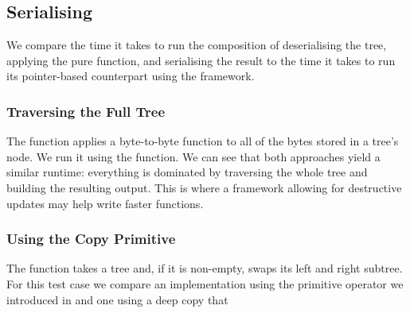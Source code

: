 

\subsection{Serialising}


We compare the time it takes to run the composition of deserialising
the tree, applying the pure function, and serialising the result
to the time it takes to run its pointer-based counterpart using the
 framework.

\subsubsection{Traversing the Full Tree}

The  function applies a byte-to-byte function
to all of the bytes stored in a tree's node.
%
We run it using the \IdrisKeyword{(}\IdrisFunction{+} \IdrisKeyword{)}
function.
%
We can see that both approaches yield a similar runtime: everything is
dominated by traversing the whole tree and building the resulting output.
%
This is where a framework allowing for destructive updates may help
write faster functions.

\noindent
\begin{minipage}{.5\textwidth}
\end{minipage}\hfill
\begin{minipage}{.45\textwidth}
\end{minipage}

\subsubsection{Using the Copy Primitive}

The  function takes a tree and, if it is non-empty,
swaps its left and right subtree. For this test case we compare an
implementation using the primitive  operator we
introduced in  and one using a deep copy that

\noindent
\begin{minipage}{.5\textwidth}
\end{minipage}\hfill
\begin{minipage}{.45\textwidth}
\end{minipage}
